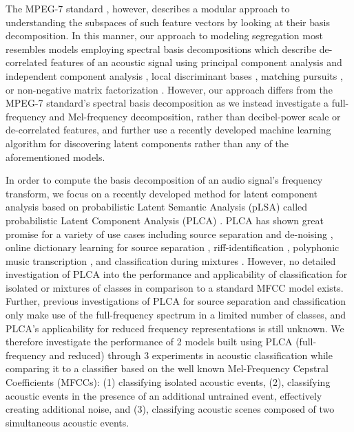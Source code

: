 \documentclass[a4paper,10pt,final]{ThesisStyle}
\begin{document}
The MPEG-7 standard \cite{Casey2001a,Manjunath2002}, however, describes a modular approach to understanding the subspaces of such feature vectors by looking at their basis decomposition.  In this manner, our approach to modeling segregation most resembles models employing spectral basis decompositions which describe de-correlated features of an acoustic signal using principal component analysis and independent component analysis \cite{Casey2001a,Xiong2003,Kim2004}, local discriminant bases \cite{Su2011}, matching pursuits \cite{Chu2009a}, or non-negative matrix factorization \cite{Raj2010}.  However, our approach differs from the MPEG-7 standard's spectral basis decomposition \cite{Casey2001a} as we instead investigate a full-frequency and Mel-frequency decomposition, rather than decibel-power scale or de-correlated features, and further use a recently developed machine learning algorithm for discovering latent components rather than any of the aforementioned models.

In order to compute the basis decomposition of an audio signal's frequency transform, we focus on a recently developed method for latent component analysis based on probabilistic Latent Semantic Analysis (pLSA) \cite{Hofmann1999} called probabilistic Latent Component Analysis (PLCA) \cite{SmaragdisRajShashanka}.   PLCA has shown great promise for a variety of use cases including source separation and de-noising \cite{Smaragdis2007a,Smaragdis2007}, online dictionary learning for source separation \cite{Duan2012}, riff-identification \cite{Weiss2011}, polyphonic music transcription \cite{Benetos2011}, and classification during mixtures \cite{Nam2012}.  However, no detailed investigation of PLCA into the performance and applicability of classification for isolated or mixtures of classes in comparison to a standard MFCC model exists.  Further, previous investigations of PLCA for source separation and classification only make use of the full-frequency spectrum in a limited number of classes, and PLCA's applicability for reduced frequency representations is still unknown.  We therefore investigate the performance of 2 models built using PLCA (full-frequency and reduced) through 3 experiments in acoustic classification while comparing it to a classifier based on the well known Mel-Frequency Cepstral Coefficients (MFCCs): (1) classifying isolated acoustic events, (2), classifying acoustic events in the presence of an additional untrained event, effectively creating additional noise, and (3), classifying acoustic scenes composed of two simultaneous acoustic events.  
\end{document}
